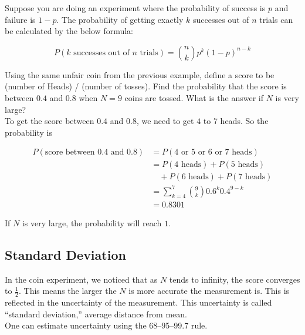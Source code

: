 Suppose you are doing an experiment where the probability of success is $p$ and failure is $1-p$. The probability of getting exactly $k$ successes out of $n$ trials can be calculated by the below formula:

$$P(\text{$k$ successes out of $n$ trials})=\binom{n}{k}p^k(1-p)^{n-k}$$

\begin{texample}
	Using the same unfair coin from the previous example, define a score to be (number of Heads) / (number of tosses). Find the probability that the score is between $0.4$ and $0.8$ when $N=9$ coins are tossed. What is the answer if $N$ is very large? \\
	
	To get the score between $0.4$ and $0.8$, we need to get $4$ to $7$ heads. So the probability is
	
	\begin{align*}
		P(\text{score between 0.4 and 0.8})&=P(\text{4 or 5 or 6 or 7 heads}) \\
		&= P(\text{4 heads})+P(\text{5 heads}) \\
		&\quad + P(\text{6 heads})+P(\text{7 heads}) \\
		&= \sum_{k=4}^7 \binom{9}{k}0.6^k0.4^{9-k} \\
		&= 0.8301
	\end{align*}
	
	If $N$ is very large, the probability will reach $1$.
\end{texample}

\subsection{Standard Deviation}

In the coin experiment, we noticed that as $N$ tends to infinity, the score converges to $\frac{1}{2}$. This means the larger the $N$ is more accurate the measurement is. This is reflected in the uncertainty of the measurement. This uncertainty is called ``standard deviation,'' average distance from mean. \\

One can estimate uncertainty using the 68–95–99.7 rule.

